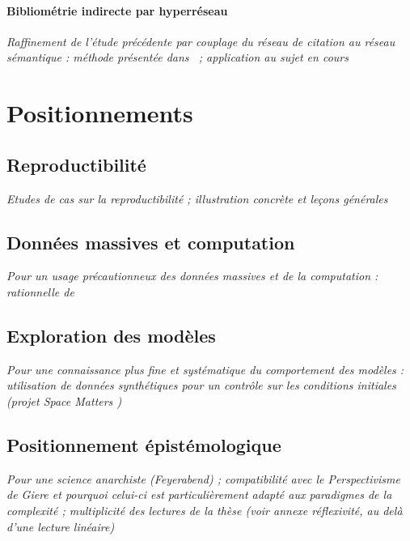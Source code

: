 \paragraph{Bibliométrie indirecte par hyperréseau}


\textit{Raffinement de l'étude précédente par couplage du réseau de citation au réseau sémantique : méthode présentée dans~\cite{raimbault2016indirect} ; application au sujet en cours} 





\section{Positionnements}


\subsection{Reproductibilité}

\textit{Etudes de cas sur la reproductibilité ; illustration concrète et leçons générales}

\subsection{Données massives et computation}

\textit{Pour un usage précautionneux des données massives et de la computation : rationnelle de~\cite{raimbault2016cautious}}


\subsection{Exploration des modèles}

\textit{Pour une connaissance plus fine et systématique du comportement des modèles : utilisation de données synthétiques pour un contrôle sur les conditions initiales (projet Space Matters \cite{cottineau2015revisiting})}


\subsection{Positionnement épistémologique}

\textit{Pour une science anarchiste (Feyerabend) ; compatibilité avec le Perspectivisme de Giere et pourquoi celui-ci est particulièrement adapté aux paradigmes de la complexité ; multiplicité des lectures de la thèse (voir annexe réflexivité, au delà d'une lecture linéaire)} 




